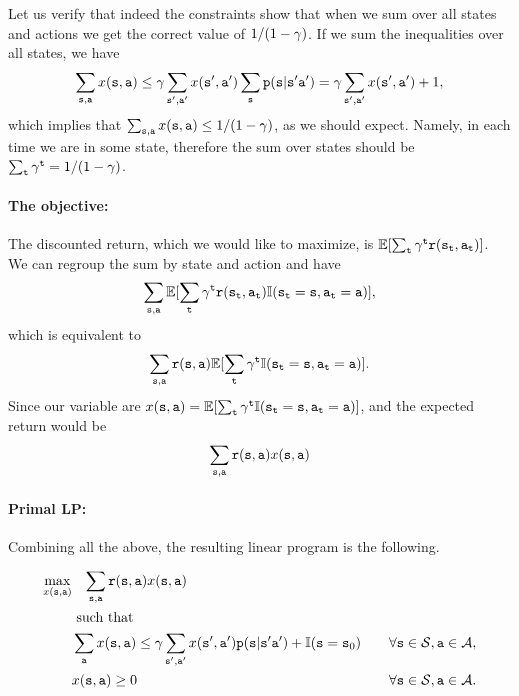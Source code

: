 Let us verify that indeed the constraints show that when we sum over all states and actions  we get the correct value of $1/(1-\gamma)$.
If we sum the inequalities over all states, we have
\[
\sum_{{\tt s},{\tt a}} x({\tt s},{\tt a})\leq\gamma
\sum_{{\tt s}',{\tt a}'} x({\tt s}',{\tt a}')\sum_{\tt s}
{\tt p}({\tt s}|{\tt s}'{\tt a}')=\gamma \sum_{{\tt s}',{\tt a}'}
x({\tt s}',{\tt a}')+1,\]
%
which implies that $\sum_{{\tt s},{\tt a}} x({\tt s},{\tt a})\leq
1/(1-\gamma)$, as we should expect. Namely, in each time we are
in some state, therefore the sum over states should be $\sum_{\tt t}
\gamma^{\tt t}=1/(1-\gamma)$.

\paragraph{The objective:}
The discounted return, which we would like to maximize, is
$\mathbb{E}[\sum_{\tt t}
\gamma^{\tt t}{\tt r}({\tt s}_{\tt t},{\tt a}_{\tt t}) ]$. We can
regroup the sum by state and action and have
\[
\sum_{{\tt s},{\tt a}}\mathbb{E}[\sum_{\tt t}
\gamma^{\tt t}{\tt r}({\tt s}_{\tt t},{\tt a}_{\tt t})\mathbb{I}({\tt s}_{\tt t}={\tt s},{\tt a}_{\tt t}={\tt a})],
\]
which is equivalent to 
\[
\sum_{{\tt s},{\tt a}}{\tt r}({\tt s},{\tt a})
\mathbb{E}[\sum_{\tt t}
\gamma^{\tt t}\mathbb{I}({\tt s}_{\tt t}={\tt s},{\tt a}_{\tt t}={\tt a})].
\]
Since our variable are $x({\tt s},{\tt a})=\mathbb{E}[\sum_{\tt t}
\gamma^{\tt t}\mathbb{I}({\tt s}_{\tt t}={\tt s},{\tt a}_{\tt t}={\tt a})]$,
and the expected return would be
\[
\sum_{{\tt s},{\tt a}} {\tt r}({\tt s},{\tt a})x({\tt s},{\tt a})
\]

\paragraph{Primal LP:}
Combining all the above, the resulting linear program is the following.

\begin{align*}
\max_{x(\state,\action)}&\;\;\; \sum_{\state,\action}
\reward(\state,\action)x(\state,\action)\\
&\mbox{ such that }\\
%
&\sum_{\action} x(\state,\action)\leq \discount
\sum_{\state',\action'} x(\state',\action')\transitionprob(\state|\state'\action')+\I(\state=\state_0)
&\quad\forall \state \in {\States}, \action\in\Actions,\\
%
%
&x(\state,\action) \geq 0  &\quad\forall \state \in {\States},
\action\in\Actions.
%
%
\end{align*}



